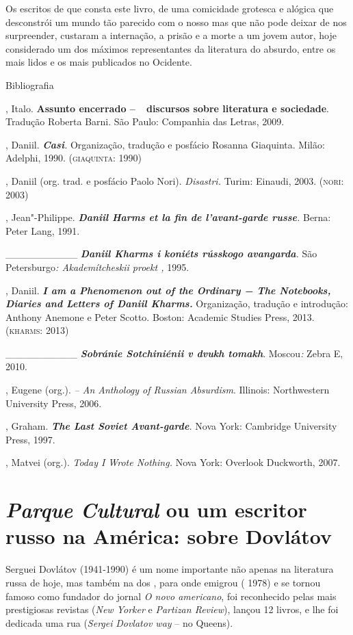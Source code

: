 Os escritos de que consta este livro, de uma comicidade grotesca e
alógica que desconstrói um mundo tão parecido com o nosso mas que não
pode deixar de nos surpreender, custaram a internação, a prisão e a
morte a um jovem autor, hoje considerado um dos máximos representantes
da literatura do absurdo, entre os mais lidos e os mais publicados no
Ocidente.

Bibliografia

, Italo. \textbf{Assunto encerrado --~~discursos sobre literatura
e sociedade}. Tradução Roberta Barni. São Paulo: Companhia das Letras,
2009.

, Daniil. \emph{\textbf{Casi}.} Organização, tradução e posfácio
Rosanna Giaquinta. Milão: Adelphi, 1990. (\textsc{giaquinta}: 1990)

, Daniil (org. trad. e posfácio Paolo Nori). \emph{Disastri.}
Turim: Einaudi, 2003. (\textsc{nori}: 2003)

, Jean"-Philippe. \emph{\textbf{Daniil Harms et la fin de
l'avant-garde russe}.} Berna: Peter Lang, 1991.~

\_\_\_\_\_\_\_\_\_\_ \emph{\textbf{Daniil Kharms i koniéts rússkogo
avangarda}.} São Petersburgo\emph{: Akademítcheskii proekt ,} 1995.

, Daniil. \emph{\textbf{I am a Phenomenon out of the Ordinary −
The Notebooks, Diaries and Letters of Daniil Kharms.}} Organização,
tradução e introdução: Anthony Anemone e Peter Scotto. Boston: Academic
Studies Press, 2013. (\textsc{kharms}: 2013)

\_\_\_\_\_\_\_\_\_\_ \emph{\textbf{Sobránie Sotchiniénii v dvukh
tomakh}}. Moscou\emph{:} Zebra E, 2010.

, Eugene (org.). \emph{ -- An Anthology of
Russian Absurdism}. Illinois: Northwestern University Press, 2006.

, Graham. \emph{\textbf{The Last Soviet Avant-garde}.} Nova York:
Cambridge University Press, 1997.

, Matvei (org.). \emph{Today I Wrote Nothing.} Nova York:
Overlook Duckworth, 2007.

\chapter{\emph{Parque Cultural} ou um escritor russo na América: sobre 
Dovlátov}

Serguei Dovlátov (1941-1990) é um nome importante não apenas na
literatura russa de hoje, mas também na dos , para onde emigrou (
1978) e se tornou famoso como fundador do jornal \emph{O novo
americano}, foi reconhecido pelas mais prestigiosas revistas (\emph{New
Yorker} e \emph{Partizan Review}), lançou 12 livros, e lhe foi dedicada
uma rua (\emph{Sergei} \emph{Dovlatov way} -- no Queens).

